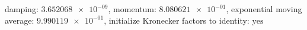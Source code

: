 damping: $\num[scientific-notation=true]{3.652068e-09}$, momentum: $\num[scientific-notation=true]{8.080621e-01}$, exponential moving average: $\num[scientific-notation=true]{9.990119e-01}$, initialize Kronecker factors to identity: $\text{yes}$